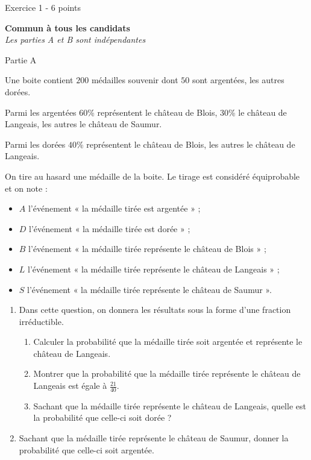 
%
\begin{h2}Exercice 1 - 6 points\end{h2}
\textbf{Commun à tous les candidats}
\\
\textit{Les parties A et B sont indépendantes}
\par
\begin{h3}Partie A\end{h3}
Une boite contient $200$ médailles souvenir dont $50$ sont argentées, les autres dorées.
\par
Parmi les argentées $60$\% représentent le château de Blois, $30$\% le château de Langeais, les autres le château de Saumur.
\par
Parmi les dorées $40$\% représentent le château de Blois, les autres le château de Langeais.
\par
On tire au hasard une médaille de la boite. Le tirage est considéré équiprobable et on note :
\begin{itemize}
     \item
     $A$ l'événement « la médaille tirée est argentée » ;
     \item
     $D$ l'événement « la médaille tirée est dorée » ;
     \item
     $B$ l'événement « la médaille tirée représente le château de Blois » ;
     \item
     $L$ l'événement « la médaille tirée représente le château de Langeais » ;
     \item
$S$ l'événement « la médaille tirée représente le château de Saumur ».\end{itemize}
\begin{enumerate}
     \item
     Dans cette question, on donnera les résultats sous la forme d'une fraction irréductible.
     \begin{enumerate}
          \item
          Calculer la probabilité que la médaille tirée soit argentée et représente le château de Langeais.
          \item
          Montrer que la probabilité que la médaille tirée représente le château de Langeais est égale à $\frac{21}{40}$.
          \item
          Sachant que la médaille tirée représente le château de Langeais, quelle est la probabilité que celle-ci soit dorée ?
     \end{enumerate}
     \item
     Sachant que la médaille tirée représente le château de Saumur, donner la probabilité que celle-ci soit argentée.
\end{enumerate}
